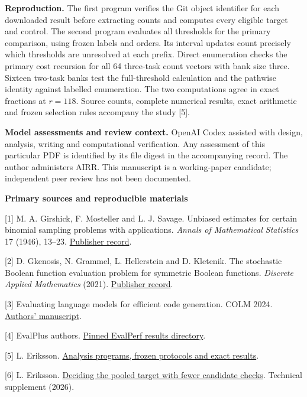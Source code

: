 \documentclass[10pt,a4paper]{article}
\begin{document}
\textbf{Reproduction.} The first program verifies the Git object identifier for each downloaded result before extracting counts and computes every eligible target and control. The second program evaluates all thresholds for the primary comparison, using frozen labels and orders. Its interval updates count precisely which thresholds are unresolved at each prefix. Direct enumeration checks the primary cost recursion for all 64 three-task count vectors with bank size three. Sixteen two-task banks test the full-threshold calculation and the pathwise identity against labelled enumeration. The two computations agree in exact fractions at $r=118$. Source counts, complete numerical results, exact arithmetic and frozen selection rules accompany the study [5].

\textbf{Model assessments and review context.} OpenAI Codex assisted with design, analysis, writing and computational verification. Any assessment of this particular PDF is identified by its file digest in the accompanying record. The author administers AIRR. This manuscript is a working-paper candidate; independent peer review has not been documented.

\small
\textbf{Primary sources and reproducible materials}

[1] M. A. Girshick, F. Mosteller and L. J. Savage. Unbiased estimates for certain binomial sampling problems with applications. \emph{Annals of Mathematical Statistics} 17 (1946), 13--23. \href{https://doi.org/10.1214/aoms/1177731018}{Publisher record}.

[2] D. Gkenosis, N. Grammel, L. Hellerstein and D. Kletenik. The stochastic Boolean function evaluation problem for symmetric Boolean functions. \emph{Discrete Applied Mathematics} (2021). \href{https://www.sciencedirect.com/science/article/pii/S0166218X21004790}{Publisher record}.

[3] Evaluating language models for efficient code generation. COLM 2024. \href{https://arxiv.org/abs/2408.06450}{Authors' manuscript}.

[4] EvalPlus authors. \href{https://github.com/evalplus/evalplus.github.io/tree/87418456d3a8c2bc6265f24ff91d2dd0e7993f4b/results/evalperf}{Pinned EvalPerf results directory}.

[5] L. Eriksson. \href{https://github.com/lluiseriksson/THE-ERIKSSON-PROGRAMME/tree/77f5f314a1984aa05690775cb2fbcbf9759be0d6/audits/first-success-batches}{Analysis programs, frozen protocols and exact results}.

[6] L. Eriksson. \href{https://github.com/lluiseriksson/THE-ERIKSSON-PROGRAMME/blob/d38ff1364c05b1ad0be15b5283f5bdbb7d01a3a7/audits/first-success-batches/global-quorum.md}{Deciding the pooled target with fewer candidate checks}. Technical supplement (2026).
\end{document}
